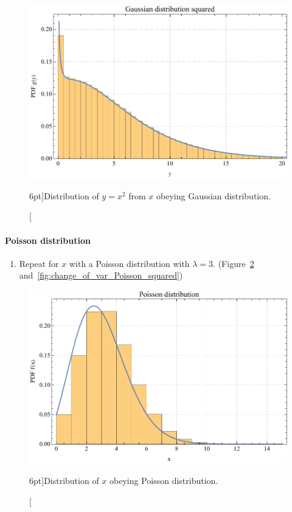 \begin{figure}
	\includegraphics{exercise/change_of_var_Gaussian_squared.pdf}
	\caption[Distribution of $y = x^{2}$ from $x$ obeying Gaussian distribution.][6pt]{Distribution of $y = x^{2}$ from $x$ obeying Gaussian distribution.}
	\label{fig:change_of_var_Gaussian_squared}
\end{figure}

\paragraph{Poisson distribution}

\begin{enumerate}
	\item Repeat for $x$ with a Poisson distribution with $\lambda = 3$. (Figure~\ref{fig:change_of_var_Poisson} and~\ref{fig:change_of_var_Poisson_squared})
\end{enumerate}

\begin{figure}
	\includegraphics{exercise/change_of_var_Poisson.pdf}
	\caption[Distribution of $x$ obeying Poisson distribution.][6pt]{Distribution of $x$ obeying Poisson distribution.}
	\label{fig:change_of_var_Poisson}
\end{figure}

